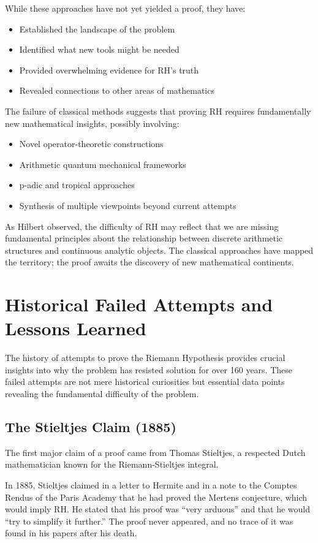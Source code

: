 While these approaches have not yet yielded a proof, they have:
\begin{itemize}
\item Established the landscape of the problem
\item Identified what new tools might be needed
\item Provided overwhelming evidence for RH's truth
\item Revealed connections to other areas of mathematics
\end{itemize}

The failure of classical methods suggests that proving RH requires fundamentally new mathematical insights, possibly involving:
\begin{itemize}
\item Novel operator-theoretic constructions
\item Arithmetic quantum mechanical frameworks  
\item p-adic and tropical approaches
\item Synthesis of multiple viewpoints beyond current attempts
\end{itemize}

As Hilbert observed, the difficulty of RH may reflect that we are missing fundamental principles about the relationship between discrete arithmetic structures and continuous analytic objects. The classical approaches have mapped the territory; the proof awaits the discovery of new mathematical continents.

\section{Historical Failed Attempts and Lessons Learned}

The history of attempts to prove the Riemann Hypothesis provides crucial insights into why the problem has resisted solution for over 160 years. These failed attempts are not mere historical curiosities but essential data points revealing the fundamental difficulty of the problem.

\subsection{The Stieltjes Claim (1885)}

The first major claim of a proof came from Thomas Stieltjes, a respected Dutch mathematician known for the Riemann-Stieltjes integral.

\begin{historicalnote}
In 1885, Stieltjes claimed in a letter to Hermite and in a note to the Comptes Rendus of the Paris Academy that he had proved the Mertens conjecture, which would imply RH. He stated that his proof was ``very arduous'' and that he would ``try to simplify it further.'' The proof never appeared, and no trace of it was found in his papers after his death.
\end{historicalnote}

